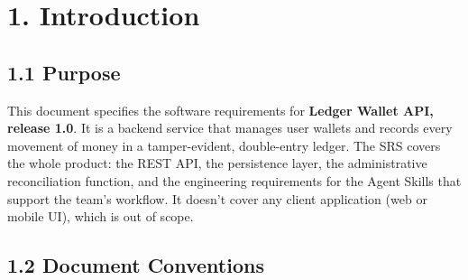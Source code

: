 \documentclass[11pt,a4paper]{article}
\begin{document}
\clearpage
{}

\section{1. Introduction}\label{introduction}

\subsection{1.1 Purpose}\label{purpose}

This document specifies the software requirements for \textbf{Ledger Wallet API, release 1.0}. It is a
backend service that manages user wallets and records every movement of money in a tamper-evident,
double-entry ledger. The SRS covers the whole product: the REST API, the persistence layer, the
administrative reconciliation function, and the engineering requirements for the Agent Skills
that support the team's workflow. It doesn't cover any client application (web or mobile UI),
which is out of scope.

\subsection{1.2 Document Conventions}\label{document-conventions}
\end{document}
